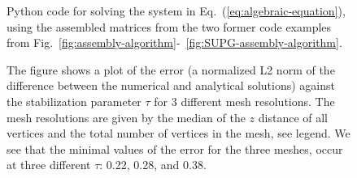 \begin{figure}
  \centering
  \vspace{-1.5em}
  \caption{Python code for solving the system in Eq.~(\ref{eq:algebraic-equation}), using the assembled matrices from the two former code examples from Fig.~\ref{fig:assembly-algorithm}-~\ref{fig:SUPG-assembly-algorithm}.}
  \label{fig:solving-algorithm}
\end{figure}

\newcommand{\leftfigsize}{0.66\linewidth}
\newcommand{\rightfigsize}{0.31\linewidth}

\begin{figure}[t]
    \begin{minipage}[t]{\leftfigsize}
    \end{minipage}
    \hfill
    \begin{minipage}{\rightfigsize}
      \caption{The figure shows a plot of the error (a normalized L2 norm of the difference between the numerical and analytical solutions) against the stabilization parameter $\tau$ for 3 different mesh resolutions. The mesh resolutions are given by the median of the $z$ distance of all vertices and the total number of vertices in the mesh, see legend. We see that the minimal values of the error for the three meshes, occur at three different $\tau$: 0.22, 0.28, and 0.38.}
      \label{fig:error_plot}
    \end{minipage}
\end{figure}

